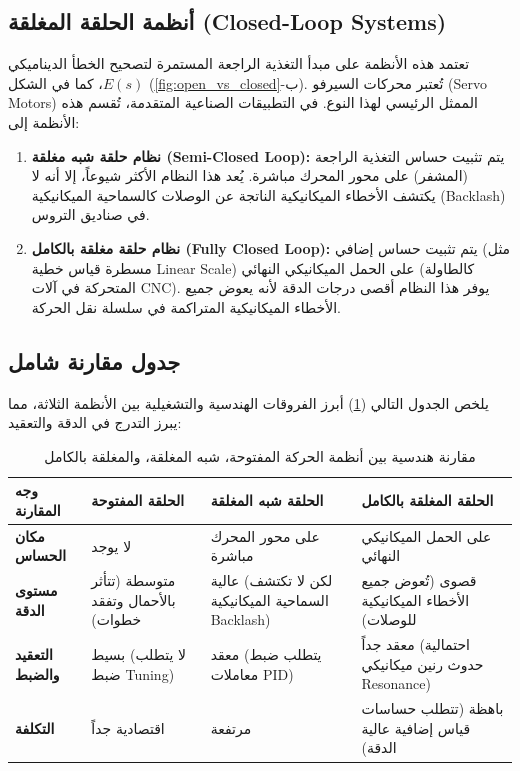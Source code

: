 \subsection{أنظمة الحلقة المغلقة (\textenglish{Closed-Loop Systems})}
تعتمد هذه الأنظمة على مبدأ التغذية الراجعة المستمرة لتصحيح الخطأ الديناميكي $E(s)$، كما في الشكل (\ref{fig:open_vs_closed}-ب). تُعتبر محركات السيرفو (\textenglish{Servo Motors}) الممثل الرئيسي لهذا النوع. في التطبيقات الصناعية المتقدمة، تُقسم هذه الأنظمة إلى:
\begin{enumerate}
    \item \textbf{نظام حلقة شبه مغلقة (\textenglish{Semi-Closed Loop}):} يتم تثبيت حساس التغذية الراجعة (المشفر) على محور المحرك مباشرة. يُعد هذا النظام الأكثر شيوعاً، إلا أنه لا يكتشف الأخطاء الميكانيكية الناتجة عن الوصلات كالسماحية الميكانيكية (\textenglish{Backlash}) في صناديق التروس.
    \item \textbf{نظام حلقة مغلقة بالكامل (\textenglish{Fully Closed Loop}):} يتم تثبيت حساس إضافي (مثل مسطرة قياس خطية \textenglish{Linear Scale}) على الحمل الميكانيكي النهائي (كالطاولة المتحركة في آلات \textenglish{CNC}). يوفر هذا النظام أقصى درجات الدقة لأنه يعوض جميع الأخطاء الميكانيكية المتراكمة في سلسلة نقل الحركة.
\end{enumerate}

\subsection{جدول مقارنة شامل}
يلخص الجدول التالي (\ref{tab:comparison}) أبرز الفروقات الهندسية والتشغيلية بين الأنظمة الثلاثة، مما يبرز التدرج في الدقة والتعقيد:

\begin{table}[h!]
    \centering
    \renewcommand{\arraystretch}{1.4}
    \begin{tabular}{|p{3cm}|p{3.5cm}|p{4cm}|p{4cm}|}
        \hline
        \textbf{وجه المقارنة} & \textbf{الحلقة المفتوحة} & \textbf{الحلقة شبه المغلقة} & \textbf{الحلقة المغلقة بالكامل} \\
        \hline
        \textbf{مكان الحساس} & لا يوجد & على محور المحرك مباشرة & على الحمل الميكانيكي النهائي \\
        \hline
        \textbf{مستوى الدقة} & متوسطة (تتأثر بالأحمال وتفقد خطوات) & عالية (لكن لا تكتشف السماحية الميكانيكية \textenglish{Backlash}) & قصوى (تُعوض جميع الأخطاء الميكانيكية للوصلات) \\
        \hline
        \textbf{التعقيد والضبط} & بسيط (لا يتطلب ضبط \textenglish{Tuning}) & معقد (يتطلب ضبط معاملات \textenglish{PID}) & معقد جداً (احتمالية حدوث رنين ميكانيكي \textenglish{Resonance}) \\
        \hline
        \textbf{التكلفة} & اقتصادية جداً & مرتفعة & باهظة (تتطلب حساسات قياس إضافية عالية الدقة) \\
        \hline
    \end{tabular}
    \caption{{\centering مقارنة هندسية بين أنظمة الحركة المفتوحة، شبه المغلقة، والمغلقة بالكامل}}
    \label{tab:comparison}
\end{table}